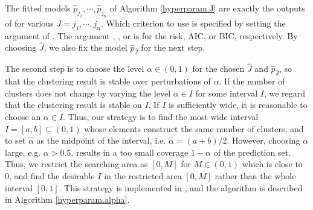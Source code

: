 The fitted models $\hat{p}_{j_1},\cdots,\hat{p}_{j_n}$ of Algorithm \ref{hyperparam.J} are exactly the outputs of  for various $J=j_1,\cdots,j_n$. Which criterion to use is specified by setting the argument  of . The argument , , or  is for the risk, AIC, or BIC, respectively. By choosing $\hat{J}$, we also fix the model $\hat{p}_{\hat{J}}$ for the next step.

The second step is to choose the level $\alpha\in (0,1)$ for the chosen $\hat{J}$ and $\hat{p}_{\hat{J}}$, so that the clustering result is stable over perturbations of $\alpha$. If the number of clusters does not change by varying the level $\alpha\in I$ for some interval $I$, we regard that the clustering result is stable on $I$. If $I$ is sufficiently wide, it is reasonable to choose an $\alpha\in I$. Thus, our strategy is to find the most wide interval $I = [a,b]\subseteq (0,1)$ whose elements construct the same number of clusters, and to set $\hat{\alpha}$ as the midpoint of the interval, i.e. $\hat\alpha = (a+b)/2$. %
However, choosing $\alpha$ large, e.g. $\alpha>0.5$, results in a too small coverage $1-\alpha$ of the prediction set. Thus, we restrict the searching area as $[0, M]$ for $M\in (0,1)$ which is close to $0$, and find the desirable $I$ in the restricted area $[0,M]$ rather than the whole interval $[0,1]$. This strategy is implemented in , and the algorithm is described in Algorithm \ref{hyperparam.alpha}.

